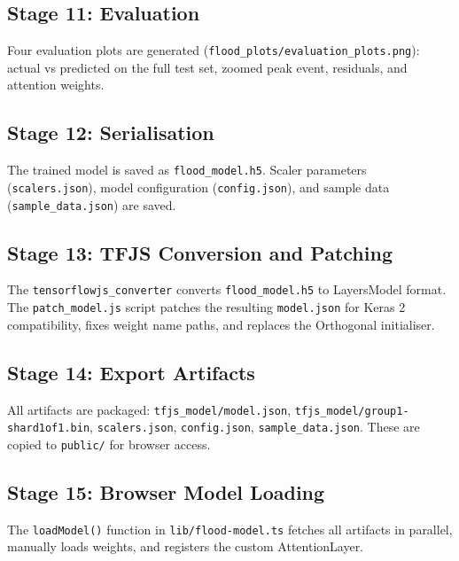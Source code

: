 \subsection{Stage 11: Evaluation}
Four evaluation plots are generated (\texttt{flood\_\allowbreak{}plots/\allowbreak{}evaluation\_\allowbreak{}plots.\allowbreak{}png}): actual vs predicted on the full test set, zoomed peak event, residuals, and attention weights.

\subsection{Stage 12: Serialisation}
The trained model is saved as \texttt{flood\_\allowbreak{}model.\allowbreak{}h5}. Scaler parameters (\texttt{scalers.\allowbreak{}json}), model configuration (\texttt{config.\allowbreak{}json}), and sample data (\texttt{sample\_\allowbreak{}data.\allowbreak{}json}) are saved.

\subsection{Stage 13: TFJS Conversion and Patching}
The \texttt{tensorflowjs\_\allowbreak{}converter} converts \texttt{flood\_\allowbreak{}model.\allowbreak{}h5} to LayersModel format. The \texttt{patch\_\allowbreak{}model.\allowbreak{}js} script patches the resulting \texttt{model.\allowbreak{}json} for Keras 2 compatibility, fixes weight name paths, and replaces the Orthogonal initialiser.

\subsection{Stage 14: Export Artifacts}
All artifacts are packaged: \texttt{tfjs\_\allowbreak{}model/\allowbreak{}model.\allowbreak{}json}, \texttt{tfjs\_\allowbreak{}model/\allowbreak{}group1-shard1of1.\allowbreak{}bin}, \texttt{scalers.\allowbreak{}json}, \texttt{config.\allowbreak{}json}, \texttt{sample\_\allowbreak{}data.\allowbreak{}json}. These are copied to \texttt{public/\allowbreak{}} for browser access.

\subsection{Stage 15: Browser Model Loading}
The \texttt{loadModel()} function in \texttt{lib/\allowbreak{}flood-model.\allowbreak{}ts} fetches all artifacts in parallel, manually loads weights, and registers the custom AttentionLayer.

